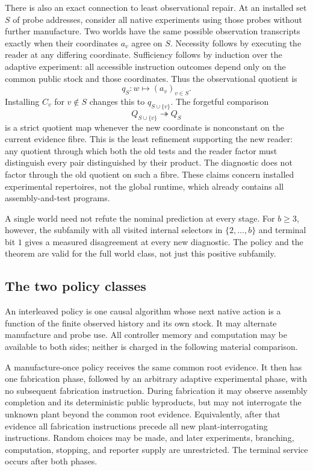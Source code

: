 \documentclass[11pt]{article}
\theoremstyle{definition}
\theoremstyle{remark}
\begin{document}
There is also an exact connection to least observational repair. At an
installed set $S$ of probe addresses, consider all native experiments
using those probes without further manufacture. Two worlds have the same
possible observation transcripts exactly when their coordinates $a_v$
agree on $S$. Necessity follows by executing the reader at any differing
coordinate. Sufficiency follows by induction over the adaptive experiment:
all accessible instruction outcomes depend only on the common public
stock and those coordinates. Thus the observational quotient is
\[
 q_S:w\longmapsto (a_v)_{v\in S}.
\]
Installing $C_v$ for $v\notin S$ changes this to $q_{S\cup\{v\}}$.
The forgetful comparison
\[
 Q_{S\cup\{v\}}\twoheadrightarrow Q_S
\]
is a strict quotient map whenever the new coordinate is nonconstant on
the current evidence fibre. This is the least refinement supporting the
new reader: any quotient through which both the old tests and the reader
factor must distinguish every pair distinguished by their product.
The diagnostic does not factor through the old quotient on such a fibre.
These claims concern installed experimental repertoires, not the global
runtime, which already contains all assembly-and-test programs.

A single world need not refute the nominal prediction at every stage.
For $b\geq3$, however, the subfamily with all visited internal selectors
in $\{2,\ldots,b\}$ and terminal bit $1$ gives a measured disagreement
at every new diagnostic. The policy and the theorem are valid for the
full world class, not just this positive subfamily.

\subsection{The two policy classes}
An interleaved policy is one causal algorithm whose next native action is
a function of the finite observed history and its own stock. It may
alternate manufacture and probe use. All controller memory and computation
may be available to both sides; neither is charged in the following
material comparison.

A manufacture-once policy receives the same common root evidence. It then
has one fabrication phase, followed by an arbitrary adaptive experimental
phase, with no subsequent fabrication instruction. During fabrication it
may observe assembly completion and its deterministic public byproducts,
but may not interrogate the unknown plant beyond the common root evidence.
Equivalently, after that evidence all fabrication instructions precede all
new plant-interrogating instructions. Random choices may be made, and later
experiments, branching, computation, stopping, and reporter supply are
unrestricted. The terminal service occurs after both phases.
\end{document}

